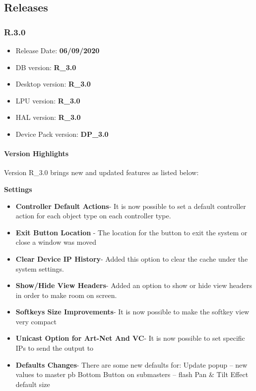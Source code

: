 \documentclass[
]{article}
\providecommand{\tightlist}{%
  \setlength{\itemsep}{0pt}\setlength{\parskip}{0pt}}
\begin{document}
\hypertarget{releases}{%
\subsection{Releases}\label{releases}}

\hypertarget{r.3.0}{%
\subsubsection{R.3.0}\label{r.3.0}}

\begin{itemize}
\tightlist
\item
  Release Date: \textbf{06/09/2020}
\item
  DB version: \textbf{R\_3.0}
\item
  Desktop version: \textbf{R\_3.0}
\item
  LPU version: \textbf{R\_3.0}
\item
  HAL version: \textbf{R\_3.0}
\item
  Device Pack version: \textbf{DP\_3.0}
\end{itemize}

\hypertarget{version-highlights}{%
\paragraph{Version Highlights}\label{version-highlights}}

Version R\_3.0 brings new and updated features as listed below:

\textbf{Settings}

\begin{itemize}
\item
  \textbf{Controller Default Actions}- It is now possible to set a default controller action for each object type on each controller type.
\item
  \textbf{Exit Button Location} - The location for the button to exit the system or close a window was moved
\item
  \textbf{Clear Device IP History}- Added this option to clear the cache under the system settings.
\item
  \textbf{Show/Hide View Headers}- Added an option to show or hide view headers in order to make room on screen.
\item
  \textbf{Softkeys Size Improvements}- It is now possible to make the softkey view very compact
\item
  \textbf{Unicast Option for Art-Net And VC}- It is now possible to set specific IPs to send the output to
\item
  \textbf{Defaults Changes}- There are some new defaults for: Update popup -- new values to master pb Bottom Button on submasters -- flash Pan \& Tilt Effect default size
\end{itemize}
\end{document}
